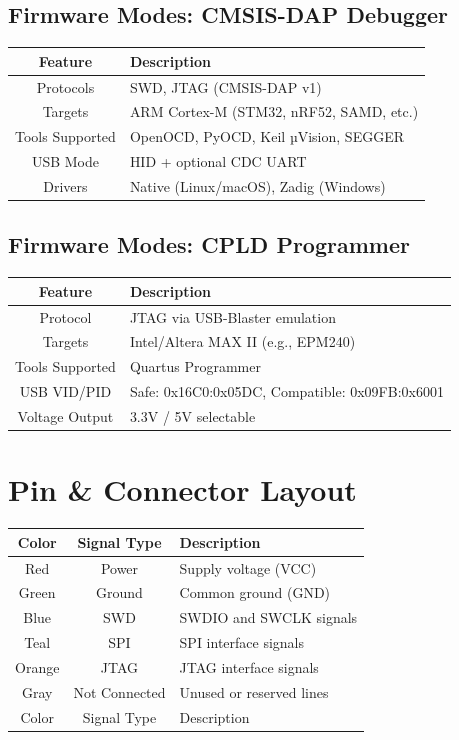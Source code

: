 \documentclass[10pt]{article}
\begin{document}
\subsection*{Firmware Modes: CMSIS-DAP Debugger}
\begin{tabularx}{\textwidth}{|c|>{\RaggedRight\arraybackslash}X|}
\hline
\rowcolor{headergray}
Feature & Description \\
\hline
Protocols & SWD, JTAG (CMSIS-DAP v1) \\
Targets & ARM Cortex-M (STM32, nRF52, SAMD, etc.) \\
Tools Supported & OpenOCD, PyOCD, Keil µVision, SEGGER \\
USB Mode & HID + optional CDC UART \\
Drivers & Native (Linux/macOS), Zadig (Windows) \\
\hline
\end{tabularx}


\subsection*{Firmware Modes: CPLD Programmer}
\begin{tabularx}{\textwidth}{|c|>{\RaggedRight\arraybackslash}X|}
\hline
\rowcolor{headergray}
Feature & Description \\
\hline
Protocol & JTAG via USB-Blaster emulation \\
Targets & Intel/Altera MAX II (e.g., EPM240) \\
Tools Supported & Quartus Programmer \\
USB VID/PID & Safe: 0x16C0:0x05DC, Compatible: 0x09FB:0x6001 \\
Voltage Output & 3.3V / 5V selectable \\
\hline
\end{tabularx}






\section*{Pin \& Connector Layout}
\begin{tabularx}{\textwidth}{|c|c|>{\RaggedRight\arraybackslash}X|}
\hline
\rowcolor{headergray}
Color & Signal Type & Description \\
\hline
Red & Power & Supply voltage (VCC) \\
Green & Ground & Common ground (GND) \\
Blue & SWD & SWDIO and SWCLK signals \\
Teal & SPI & SPI interface signals \\
Orange & JTAG & JTAG interface signals \\
Gray & Not Connected & Unused or reserved lines \\
Color & Signal Type & Description \\
\hline
\end{tabularx}
\end{document}
